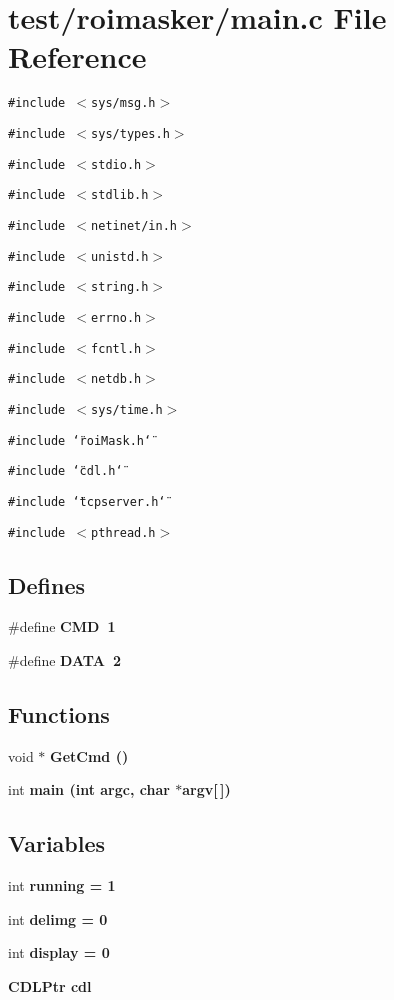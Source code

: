 \section{test/roimasker/main.c File Reference}
\label{main_8c}
{\tt \#include $<$sys/msg.h$>$}\par
{\tt \#include $<$sys/types.h$>$}\par
{\tt \#include $<$stdio.h$>$}\par
{\tt \#include $<$stdlib.h$>$}\par
{\tt \#include $<$netinet/in.h$>$}\par
{\tt \#include $<$unistd.h$>$}\par
{\tt \#include $<$string.h$>$}\par
{\tt \#include $<$errno.h$>$}\par
{\tt \#include $<$fcntl.h$>$}\par
{\tt \#include $<$netdb.h$>$}\par
{\tt \#include $<$sys/time.h$>$}\par
{\tt \#include \char`\"{}roi\-Mask.h\char`\"{}}\par
{\tt \#include \char`\"{}cdl.h\char`\"{}}\par
{\tt \#include \char`\"{}tcpserver.h\char`\"{}}\par
{\tt \#include $<$pthread.h$>$}\par
\subsection*{Defines}
\begin{CompactItemize}
\item 
\#define \bf{CMD}~1
\item 
\#define \bf{DATA}~2
\end{CompactItemize}
\subsection*{Functions}
\begin{CompactItemize}
\item 
void $\ast$ \bf{Get\-Cmd} ()
\item 
int \bf{main} (int argc, char $\ast$argv[$\,$])
\end{CompactItemize}
\subsection*{Variables}
\begin{CompactItemize}
\item 
int \bf{running} = 1
\item 
int \bf{delimg} = 0
\item 
int \bf{display} = 0
\item 
\bf{CDLPtr} \bf{cdl}
\end{CompactItemize}


